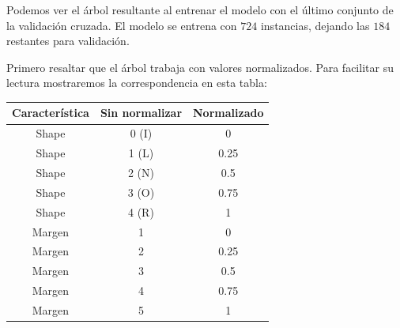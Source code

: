 \documentclass[a4]{article}
\begin{document}
Podemos ver el árbol resultante al entrenar el modelo con el último conjunto de la validación cruzada. El modelo se entrena con $724$ instancias, dejando las $184$ restantes para validación.

\begin{figure}[H]
  \centering
\end{figure}

Primero resaltar que el árbol trabaja con valores normalizados. Para facilitar su lectura mostraremos la correspondencia en esta tabla:

\begin{center}
\begin{tabular}{|c|c|c|}
\hline
  \multicolumn{1}{|c|}{\textbf{Característica}}& \textbf{Sin normalizar} & \textbf{Normalizado} \\ \hline
  Shape  & 0 (I) & 0    \\ \hline
  Shape  & 1 (L) & 0.25 \\ \hline
  Shape  & 2 (N) & 0.5  \\ \hline
  Shape  & 3 (O) & 0.75 \\ \hline
  Shape  & 4 (R) & 1    \\ \hline
  Margen & 1     & 0    \\ \hline
  Margen & 2     & 0.25 \\ \hline
  Margen & 3     & 0.5  \\ \hline
  Margen & 4     & 0.75 \\ \hline
  Margen & 5     & 1    \\ \hline

\end{tabular}
\end{center}
\end{document}
